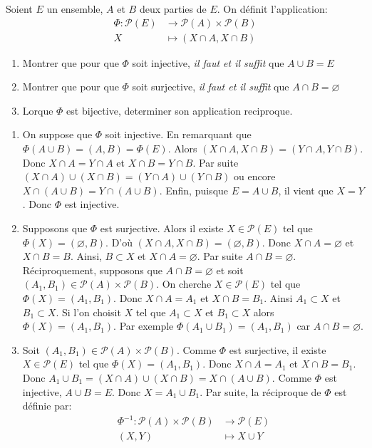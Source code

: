 \begin{exercise}[from=Devoir SR MPI 2010]
	Soient $E$ un ensemble, $A$ et $B$ deux parties de $E$. On définit l'application:
	\begin{align*}
		\Phi:  \mathcal{P}(E)&\longrightarrow \mathcal{P}(A)\times \mathcal{P}(B)\\
		X &\longmapsto (X \cap A, X \cap B)
	\end{align*}
	\begin{enumerate}
		\item Montrer que pour que $\Phi$ soit injective, \textit{il faut et il suffit} que $A\cup B = E$
		\item Montrer que pour que $\Phi$ soit surjective, \textit{il faut et il suffit} que $A\cap B = \varnothing$
		\item Lorque $\Phi$ est bijective, determiner son application reciproque.
	\end{enumerate}

	\cor
	\begin{enumerate}
		\item On suppose que $\Phi$ soit injective. En remarquant que $\Phi(A \cup B) =(A,B)=\Phi(E)$. Alors $(X\cap A, X \cap B) = (Y \cap A, Y \cap B).$ Donc $X \cap A = Y \cap A$ et $X \cap B = Y \cap B$. Par suite $(X \cap A) \cup (X \cap B) = (Y \cap A) \cup (Y \cap B)$ ou encore $X\cap (A \cup B) = Y \cap(A \cup B)$. Enfin, puisque $E=A \cup B$, il  vient que $X=Y$. Donc $\Phi$ est injective.
		\item Supposons que $\Phi$ est surjective. Alors il existe $X \in \mathcal{P}(E)$ tel que $\Phi(X)=(\varnothing, B)$. D'où $(X \cap A, X \cap B)=(\varnothing, B)$. Donc $X \cap A = \varnothing$ et $X\cap B = B$. Ainsi, $B \subset X$ et $X \cap A = \varnothing$. Par suite $A\cap B = \varnothing$. Réciproquement, supposons que $A\cap B=\varnothing$ et soit $(A_1, B_1)\in \mathcal{P}(A)\times \mathcal{P}(B)$. On cherche $X\in \mathcal{P}(E)$ tel que $\Phi (X)=(A_1,B_1)$. Donc $X\cap A =A_1$ et $X\cap B = B_1$. Ainsi $A_1 \subset X$ et $B_1 \subset X$. Si l'on choisit $X$ tel que $A_1 \subset X$  et $B_1 \subset X$ alors $\Phi (X)=(A_1,B_1)$. Par exemple $\Phi (A_1\cup B_1)=(A_1,B_1)$ car $A\cap B=\varnothing$.
		\item Soit $(A_1, B_1)\in \mathcal{P}(A)\times \mathcal{P}(B)$. Comme $\Phi$ est surjective, il existe $X\in \mathcal{P}(E)$ tel que $\Phi (X)=(A_1,B_1)$. Donc $X\cap A =A_1$ et $X\cap B = B_1$. Donc $A_1 \cup B_1 =(X\cap A)\cup (X\cap B) = X\cap (A\cup B)$. Comme $\Phi$ est injective, $A\cup B=E$. Donc $X=A_1\cup B_1$. Par suite, la réciproque de $\Phi$ est définie par:
		\begin{align*}
			\Phi^{-1}: \mathcal{P}(A)\times \mathcal{P}(B) &\longrightarrow \mathcal{P}(E)\\
			(X,Y) &\longmapsto X\cup Y
		\end{align*}
	\end{enumerate}
\end{exercise}

